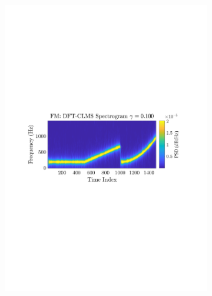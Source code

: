 \documentclass[12pt]{article}
\begin{document}
\begin{figure}[H]
				\begin{subfigure}{0.49\textwidth}
					\centering
					\includegraphics[trim={2.2cm 11.2cm 3.00cm  11.2cm}, clip, width=\textwidth]{../MATLAB/figures/q3_3c_fig04.pdf} 
					\captionsetup{justification=centering}
				\end{subfigure}
				\begin{subfigure}{0.49\textwidth}
					\centering

\end{subfigure}
\end{figure}
\end{document}
